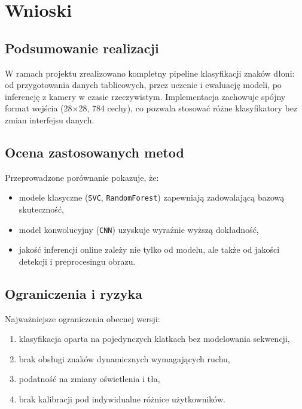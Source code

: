 \chapter{Wnioski}
\label{cha:wnioski}

\section{Podsumowanie realizacji}
\label{sec:podsumowanie}

W ramach projektu zrealizowano kompletny pipeline klasyfikacji znaków dłoni:
od przygotowania danych tablicowych, przez uczenie i ewaluację modeli,
po inferencję z kamery w czasie rzeczywistym. Implementacja zachowuje
spójny format wejścia (28$\times$28, 784 cechy), co pozwala stosować
różne klasyfikatory bez zmian interfejsu danych.

\section{Ocena zastosowanych metod}
\label{sec:ocena_metod}

Przeprowadzone porównanie pokazuje, że:
\begin{itemize}
    \item modele klasyczne (\texttt{SVC}, \texttt{RandomForest}) zapewniają
          zadowalającą bazową skuteczność,
    \item model konwolucyjny (\texttt{CNN}) uzyskuje wyraźnie wyższą dokładność,
    \item jakość inferencji online zależy nie tylko od modelu, ale także od jakości
          detekcji i preprocesingu obrazu.
\end{itemize}

\section{Ograniczenia i ryzyka}
\label{sec:ograniczenia_ryzyka}

Najważniejsze ograniczenia obecnej wersji:
\begin{enumerate}
    \item klasyfikacja oparta na pojedynczych klatkach bez modelowania sekwencji,
    \item brak obsługi znaków dynamicznych wymagających ruchu,
    \item podatność na zmiany oświetlenia i tła,
    \item brak kalibracji pod indywidualne różnice użytkowników.
\end{enumerate}

